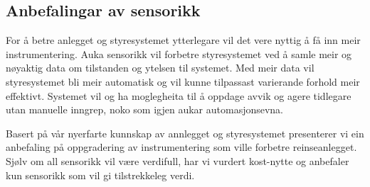 \newpage

\subsection{Anbefalingar av sensorikk}

For å betre anlegget og styresystemet ytterlegare vil det vere nyttig å få inn meir instrumentering. 
Auka sensorikk vil forbetre styresystemet ved å samle meir og nøyaktig data om tilstanden og ytelsen til systemet. 
Med meir data vil styresystemet bli meir automatisk og vil kunne tilpassast varierande forhold meir effektivt. 
Systemet vil og ha moglegheita til å oppdage avvik og agere tidlegare utan manuelle inngrep, noko som igjen aukar automasjonsevna.

Basert på vår nyerfarte kunnskap av annlegget og styresystemet presenterer vi ein
anbefaling på oppgradering av instrumentering som ville forbetre reinseanlegget. 
Sjølv om all sensorikk vil være verdifull, har vi vurdert kost-nytte og anbefaler kun sensorikk som vil gi tilstrekkeleg verdi.

